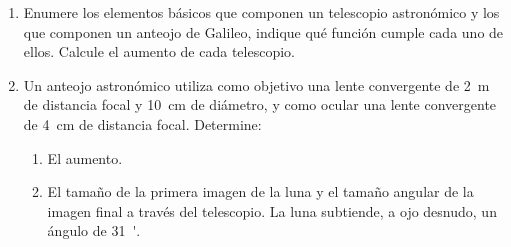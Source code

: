 \documentclass[11pt,spanish,a4paper]{article}
\begin{document}
\begin{enumerate}
\item Enumere los elementos básicos que componen un telescopio astronómico y los que componen un anteojo de Galileo, indique qué función cumple cada uno de ellos.
	Calcule el aumento de cada telescopio.


\item Un anteojo astronómico utiliza como objetivo una lente convergente de \SI{2}{m} de distancia focal y \SI{10}{cm} de diámetro, y como ocular una lente convergente de \SI{4}{cm} de distancia focal.
	Determine:
	\begin{enumerate}
		\item El aumento.
		\item El tamaño de la primera imagen de la luna y el tamaño angular de la imagen final a
través del telescopio.
La luna subtiende, a ojo desnudo, un ángulo de \SI{31}{'}.
	\end{enumerate}

	
\end{enumerate}
\end{document}
